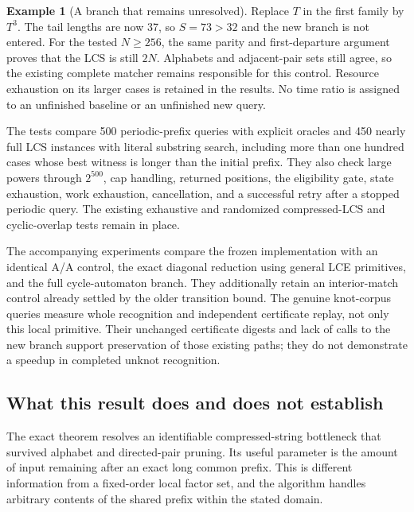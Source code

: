 \documentclass[11pt]{article}
\theoremstyle{definition}
\newtheorem{example}[theorem]{Example}
\theoremstyle{remark}
\begin{document}
\begin{example}[A branch that remains unresolved]
Replace $T$ in the first family by $T^3$. The tail lengths are now 37,
so $S=73>32$ and the new branch is not entered. For the tested
$N\ge256$, the same parity and first-departure argument proves that the
LCS is still $2N$. Alphabets and adjacent-pair sets still agree, so the
existing complete matcher remains responsible for this control.
Resource exhaustion on its larger cases is retained in the results.
No time ratio is assigned to an unfinished baseline or an unfinished
new query.
\end{example}

The tests compare 500 periodic-prefix queries with explicit oracles and
450 nearly full LCS instances with literal substring search, including
more than one hundred cases whose best witness is longer than the
initial prefix. They also check large powers through $2^{500}$,
cap handling, returned positions, the eligibility gate, state exhaustion,
work exhaustion, cancellation, and a successful retry after a stopped
periodic query. The existing exhaustive and randomized compressed-LCS
and cyclic-overlap tests remain in place.

The accompanying experiments compare the frozen implementation with an
identical A/A control, the exact diagonal reduction using general LCE
primitives, and the full cycle-automaton branch. They additionally retain
an interior-match control already settled by the older transition bound.
The genuine knot-corpus queries measure whole recognition and independent
certificate replay, not only this local primitive. Their unchanged
certificate digests and lack of calls to the new branch support
preservation of those existing paths; they do not demonstrate a speedup
in completed unknot recognition.

\subsection{What this result does and does not establish}

The exact theorem resolves an identifiable compressed-string bottleneck
that survived alphabet and directed-pair pruning. Its useful parameter is
the amount of input remaining after an exact long common prefix. This is
different information from a fixed-order local factor set, and the
algorithm handles arbitrary contents of the shared prefix within the
stated domain.
\end{document}
